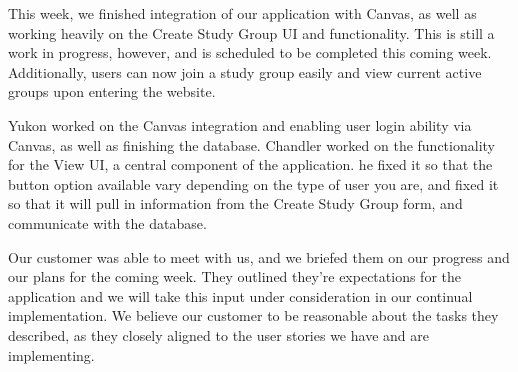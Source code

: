\documentclass[12pt,letterpaper]{article}
\begin{document}
This week, we finished integration of our application with Canvas, as well as working heavily on the Create Study Group UI and functionality. This is still a work in progress, however, and is scheduled to be completed this coming week. Additionally, users can now join a study group easily and view current active groups upon entering the website. 

Yukon worked on the Canvas integration and enabling user login ability via Canvas, as well as finishing the database. Chandler worked on the functionality for the View UI, a central component of the application. he fixed it so that the button option available vary depending on the type of user you are, and fixed it so that it will pull in information from the Create Study Group form, and communicate with the database. 

Our customer was able to meet with us, and we briefed them on our progress and our plans for the coming week. They outlined they're expectations for the application and we will take this input under consideration in our continual implementation. We believe our customer to be reasonable about the tasks they described, as they closely aligned to the user stories we have and are implementing. 
\end{document}
